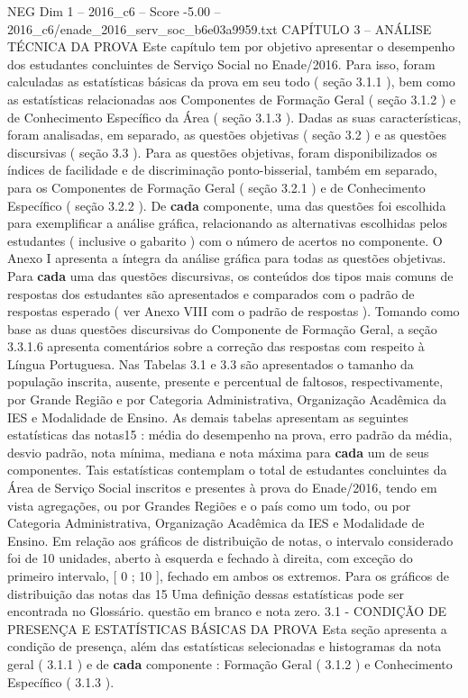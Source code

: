 \begin{textsample}{NEG Dim 1 – 2016\_c6 – Score -5.00 – 2016\_c6/enade\_2016\_serv\_soc\_b6e03a9959.txt}  \label{ex:f1_neg_050}
CAPÍTULO 3 – ANÁLISE TÉCNICA DA PROVA Este capítulo tem por objetivo apresentar o desempenho dos estudantes concluintes de Serviço Social no Enade/2016.
Para isso, foram calculadas as estatísticas básicas da prova em seu todo ( seção 3.1.1 ), bem como as estatísticas relacionadas aos Componentes de Formação Geral ( seção 3.1.2 ) e de Conhecimento Específico da Área ( seção 3.1.3 ).
Dadas as suas características, foram analisadas, em separado, as questões objetivas ( seção 3.2 ) e as questões discursivas ( seção 3.3 ).
Para as questões objetivas, foram disponibilizados os índices de facilidade e de discriminação ponto-bisserial, também em separado, para os Componentes de Formação Geral ( seção 3.2.1 ) e de Conhecimento Específico ( seção 3.2.2 ).
De \textbf{cada} componente, uma das questões foi escolhida para exemplificar a análise gráfica, relacionando as alternativas escolhidas pelos estudantes ( inclusive o gabarito ) com o número de acertos no componente.
O Anexo I apresenta a íntegra da análise gráfica para todas as questões objetivas.
Para \textbf{cada} uma das questões discursivas, os conteúdos dos tipos mais comuns de respostas dos estudantes são apresentados e comparados com o padrão de respostas esperado ( ver Anexo VIII com o padrão de respostas ).
Tomando como base as duas questões discursivas do Componente de Formação Geral, a seção 3.3.1.6 apresenta comentários sobre a correção das respostas com respeito à Língua Portuguesa.
Nas Tabelas 3.1 e 3.3 são apresentados o tamanho da população inscrita, ausente, presente e percentual de faltosos, respectivamente, por Grande Região e por Categoria Administrativa, Organização Acadêmica da IES e Modalidade de Ensino.
As demais tabelas apresentam as seguintes estatísticas das notas15 : média do desempenho na prova, erro padrão da média, desvio padrão, nota mínima, mediana e nota máxima para \textbf{cada} um de seus componentes.
Tais estatísticas contemplam o total de estudantes concluintes da Área de Serviço Social inscritos e presentes à prova do Enade/2016, tendo em vista agregações, ou por Grandes Regiões e o país como um todo, ou por Categoria Administrativa, Organização Acadêmica da IES e Modalidade de Ensino.
Em relação aos gráficos de distribuição de notas, o intervalo considerado foi de 10 unidades, aberto à esquerda e fechado à direita, com exceção do primeiro intervalo, [ 0 ; 10 ], fechado em ambos os extremos.
Para os gráficos de distribuição das notas das 15 Uma definição dessas estatísticas pode ser encontrada no Glossário. questão em branco e nota zero. 3.1 - CONDIÇÃO DE PRESENÇA E ESTATÍSTICAS BÁSICAS DA PROVA Esta seção apresenta a condição de presença, além das estatísticas selecionadas e histogramas da nota geral ( 3.1.1 ) e de \textbf{cada} componente : Formação Geral ( 3.1.2 ) e Conhecimento Específico ( 3.1.3 ).

\end{textsample}
